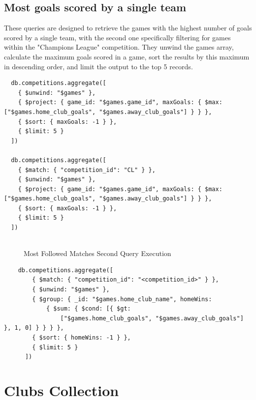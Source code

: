 \documentclass{Configuration_Files/PoliMi3i_thesis}
\begin{document}
\subsection{Most goals scored by a single team}
These queries are designed to retrieve the games with the highest number of goals scored by a single team, with the second one specifically filtering for games within the "Champions League" competition. They unwind the games array, calculate the maximum goals scored in a game, sort the results by this maximum in descending order, and limit the output to the top 5 records.
\begin{verbatim}
  db.competitions.aggregate([
    { $unwind: "$games" },
    { $project: { game_id: "$games.game_id", maxGoals: { $max: ["$games.home_club_goals", "$games.away_club_goals"] } } },
    { $sort: { maxGoals: -1 } },
    { $limit: 5 }
  ])

  db.competitions.aggregate([
    { $match: { "competition_id": "CL" } },
    { $unwind: "$games" },
    { $project: { game_id: "$games.game_id", maxGoals: { $max: ["$games.home_club_goals", "$games.away_club_goals"] } } },
    { $sort: { maxGoals: -1 } },
    { $limit: 5 }
  ])
  
\end{verbatim}
\begin{figure}[htbp]
    \centering
    \caption{Most Followed Matches Second Query Execution}
\end{figure}
\begin{verbatim}
    db.competitions.aggregate([
        { $match: { "competition_id": "<competition_id>" } },
        { $unwind: "$games" },
        { $group: { _id: "$games.home_club_name", homeWins: 
            { $sum: { $cond: [{ $gt: 
                ["$games.home_club_goals", "$games.away_club_goals"] }, 1, 0] } } } },
        { $sort: { homeWins: -1 } },
        { $limit: 5 }
      ]) 
\end{verbatim}


\section{Clubs Collection}
\end{document}
